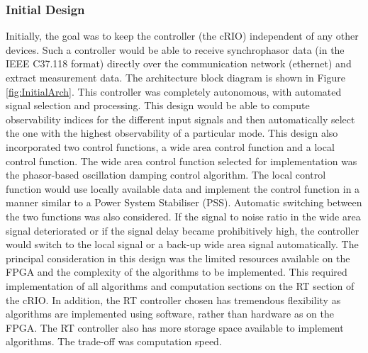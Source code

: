 \documentclass[conference]{IEEEtran}
\begin{document}
\subsubsection{Initial Design}

Initially, the goal was to keep the controller (the cRIO) independent of any other devices. Such a controller would be able to receive synchrophasor data (in the IEEE C37.118 format) directly over the communication network (ethernet) and extract measurement data. The architecture block diagram is shown in Figure  \ref{fig:InitialArch}. This controller was completely autonomous, with automated signal selection and processing. This design would be able to compute observability indices for the different input signals and then automatically select the one with the highest observability of a particular mode. This design also incorporated two control functions, a wide area control function and a local control function. The wide area control function selected for implementation was the phasor-based oscillation damping control algorithm\cite{PhasorPOD}. The local control function would use locally available data and implement the control function in a manner similar to a Power System Stabiliser (PSS). Automatic switching between the two functions was also considered. If the signal to noise ratio in the wide area signal deteriorated or if the signal delay became prohibitively high, the controller would switch to the local signal or a back-up wide area signal automatically. The principal consideration in this design was the limited resources available on the FPGA and the complexity of the algorithms to be implemented. This required implementation of all algorithms and computation sections on the RT section of the cRIO. In addition, the RT controller chosen has tremendous flexibility as algorithms are implemented using software, rather than hardware as on the FPGA. The RT controller also has more storage space available to implement algorithms. The trade-off was computation speed.

\end{document}
